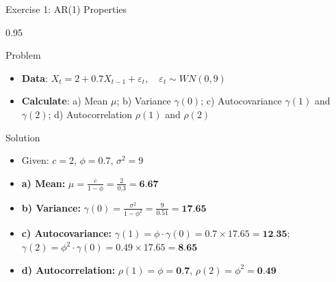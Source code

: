 \documentclass[9pt, aspectratio=169, t]{beamer}
\begin{document}
\begin{frame}{Exercise 1: AR(1) Properties}
    \begin{cminipage}{0.95\textwidth}
    \begin{alertblock}{Problem}
        \begin{itemize}\setlength{\itemsep}{0pt}
            \item \textbf{Data}: $X_t = 2 + 0.7 X_{t-1} + \varepsilon_t, \quad \varepsilon_t \sim WN(0, 9)$
            \item \textbf{Calculate}: a) Mean $\mu$; b) Variance $\gamma(0)$; c) Autocovariance $\gamma(1)$ and $\gamma(2)$; d) Autocorrelation $\rho(1)$ and $\rho(2)$
        \end{itemize}
    \end{alertblock}

    \vspace{0.2cm}
    \begin{exampleblock}{Solution}
        \begin{itemize}\setlength{\itemsep}{0pt}
            \item Given: $c = 2$, $\phi = 0.7$, $\sigma^2 = 9$
            \item \textbf{a) Mean:} $\mu = \frac{c}{1-\phi} = \frac{2}{0.3} = \textbf{6.67}$
            \item \textbf{b) Variance:} $\gamma(0) = \frac{\sigma^2}{1-\phi^2} = \frac{9}{0.51} = \textbf{17.65}$
            \item \textbf{c) Autocovariance:} $\gamma(1) = \phi \cdot \gamma(0) = 0.7 \times 17.65 = \textbf{12.35}$; \quad $\gamma(2) = \phi^2 \cdot \gamma(0) = 0.49 \times 17.65 = \textbf{8.65}$
            \item \textbf{d) Autocorrelation:} $\rho(1) = \phi = \textbf{0.7}$, $\rho(2) = \phi^2 = \textbf{0.49}$
        \end{itemize}
    \end{exampleblock}
    \end{cminipage}
\end{frame}
\end{document}
